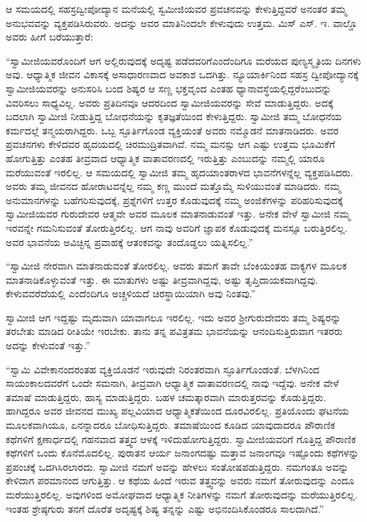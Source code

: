  ಆ ಸಮಯದಲ್ಲಿ ಸಹಸ್ರದ್ವೀಪೋದ್ಯಾನ ಮನೆಯಲ್ಲಿ ಸ್ವಮೀಜಿಯವರ ಪ್ರವಚನವನ್ನು ಕೇಳುತ್ತಿದ್ದವರೆ ಅನಂತರ ತಮ್ಮ ಅನುಭವವನ್ನು ವ್ಯಕ್ತಪಡಿಸಿರುವರು. ಅದನ್ನು ಅವರ ಮಾತಿನಿಂದಲೇ ಕೇಳುವುದು ಉತ್ತಮ. ಮಿಸ್ ಎಸ್. ಇ. ವಾಲ್ಡೊ ಅವರು ಹೀಗೆ ಬರೆಯುತ್ತಾರೆ: 

 “ಸ್ವಾಮೀಜಿಯವರೊಂದಿಗೆ ಆಗ ಅಲ್ಲಿರುವುದಕ್ಕೆ ಅದೃಷ್ಟ ಪಡೆದವರಿಗೆ\break ಎಂದೆಂದಿಗೂ ಮರೆಯದ ಪುಣ್ಯಸ್ಮೃತಿಯ ದಿನಗಳು ಅವು. ಆಧ್ಯಾತ್ಮಿಕ ಜೀವನ ವಿಕಾಸಕ್ಕೆ ಅಸಾಧಾರಣವಾದ ಅವಕಾಶ ಒದಗಿತ್ತು. ನ್ಯೂಯಾರ್ಕಿನಿಂದ ಸಹಸ್ರ ದ್ವೀಪೋದ್ಯಾನಕ್ಕೆ ಸ್ವಾಮೀಜಿಯವರನ್ನು ಅನುಸರಿಸಿ ಬಂದ ಶಿಷ್ಯರ ಆ ಸಣ್ಣ ಭಕ್ತವೃಂದ ಎಂತಹ ಧ್ಯಾನಾವಸ್ಥೆಯಲ್ಲಿದ್ದರೆಂಬುದನ್ನು ವಿವರಿಸಲು ಸಾಧ್ಯವಿಲ್ಲ. ಅವರು ಪ್ರತಿದಿನವೂ ಆದರದಿಂದ ಸ್ವಾಮೀಜಿಯವರನ್ನು ಸೇವೆ ಮಾಡುತ್ತಿದ್ದರು. ಅದಕ್ಕೆ ಬದಲಾಗಿ ಸ್ವಾಮೀಜಿ ನೀಡುತ್ತಿದ್ದ ಬೋಧನೆಯನ್ನು ಕೃತಜ್ಞತೆಯಿಂದ ಕೇಳುತ್ತಿದ್ದರು. ಸ್ವಾಮೀಜಿ ತಮ್ಮ ಬೋಧನೆಯ ಕರ್ಮದಲ್ಲೆ ತನ್ಮಯರಾಗಿದ್ದರು. ಒಬ್ಬ ಸ್ಫೂರ್ತಿಗೊಂಡ ವ್ಯಕ್ತಿಯಂತೆ ಅವರು ನಮ್ಮೊಡನೆ ಮಾತನಾಡಿದರು. ಅವರ ಪ್ರವಚನಗಳು ಕೇಳಿದವರ ಹೃದಯದಲ್ಲಿ ಚಿರಮುದ್ರಿತವಾಗಿವೆ. ನಮ್ಮ ಮನಸ್ಸು ಆಗ ಎಷ್ಟು ಉತ್ತಮ ಭೂಮಿಕೆಗೆ ಹೋಗುತ್ತಿತ್ತು ಎಂತಹ ತೀವ್ರವಾದ ಆಧ್ಯಾತ್ಮಿಕ ವಾತಾವರಣದಲ್ಲಿ ಇರುತ್ತಿತ್ತು ಎಂಬುದನ್ನು ನಮ್ಮಲ್ಲಿ ಯಾರೂ ಮರೆಯುವಂತೆ ಇರಲಿಲ್ಲ. ಆ ಸಮಯದಲ್ಲಿ ಸ್ವಾಮೀಜಿ ತಮ್ಮ ಹೃದಯಾಂತರಾಳದ ಭಾವನೆಗಳನ್ನೆಲ್ಲ ವ್ಯಕ್ತಪಡಿಸಿದರು. ಅವರು ತಮ್ಮ ಜೀವನದ ಹೋರಾಟವನ್ನೆಲ್ಲ ನಮ್ಮ ಕಣ್ಣ ಮುಂದೆ ಮತ್ತೊಮ್ಮೆ ಸುಳಿಯುವಂತೆ ಮಾಡಿದರು. ನಮ್ಮ ಅನುಮಾನಗಳನ್ನು ಬಹೆಗರಿಸುವುದಕ್ಕೆ, ಪ್ರಶ್ನೆಗಳಿಗೆ ಉತ್ತರ ಕೊಡುವುದಕ್ಕೆ ನಮ್ಮ ಅಂಜಿಕೆಗಳನ್ನು ಪರಿಹರಿಸುವುದಕ್ಕೆ ಸ್ವಾಮೀಜಿಯವರ ಗುರುದೇವರ ಆತ್ಮವೇ ಅವರ ಮೂಲಕ ಮಾತನಾಡುವಂತೆ ಇತ್ತು. ಅನೇಕ ವೇಳೆ ಸ್ವಾಮೀಜಿ ನಮ್ಮ ಇರವನ್ನೇ ಗಮನಿಸುವಂತೆ ತೋರುತ್ತಿರಲಿಲ್ಲ. ಆಗ ನಾವು ಅವರಿಗೆ ಜ್ಞಾಪಕ ಕೊಡುವುದಕ್ಕೆ ಮನಸ್ಸೂ ಬರುತ್ತಿರಲಿಲ್ಲ. ಅವರ ಭಾವನೆಯ ಅವಿಚ್ಛಿನ್ನ ಪ್ರವಾಹಕ್ಕೆ ಆತಂಕವನ್ನು ತಂದೊಡ್ಡಲು ಯತ್ನಿಸಲಿಲ್ಲ.” 

 “ಸ್ವಾಮೀಜಿ ನೇರವಾಗಿ ಮಾತನಾಡುವಂತೆ ತೋರಲಿಲ್ಲ. ಅವರು ತಮಗೆ ತಾವೇ ಬೆಂಕಿಯಂತಹ ವಾಕ್ಯಗಳ ಮೂಲಕ ಮಾತನಾಡಿಕೊಳ್ಳುವಂತೆ ಇತ್ತು. ಈ ಮಾತುಗಳು ಅಷ್ಟು ತೀವ್ರವಾಗಿದ್ದವು, ಅಷ್ಟು ತೃಪ್ತಿದಾಯಕವಾಗಿದ್ದವು. ಕೇಳುವವರೆದೆಯಲ್ಲಿ ಎಂದೆಂದಿಗೂ ಅಚ್ಚಳಿಯದೆ ಚಿರಸ್ಥಾಯಿಯಾಗಿ ಅವು ನಿಂತವು.” 

 ಸ್ವಾಮೀಜಿ ಆಗ ಇದ್ದಷ್ಟು ಮೃದುವಾಗಿ ಯಾವಾಗಲೂ ಇರಲಿಲ್ಲ. ಇದು ಅವರ ಶ‍್ರೀಗುರುದೇವರು ತಮ್ಮ ಶಿಷ್ಯರನ್ನು ತರಬೇತು ಮಾಡಿದ ರೀತಿಯೇ ಇರಬೇಕು. ತಾನು ತನ್ನ ಪವಿತ್ರತಮ ಭಾವನೆಯನ್ನು ಆನಂದಿಸುತ್ತಿರುವಾಗ ಇತರರು ಅದನ್ನು ಕೇಳುವಂತೆ ಇತ್ತು.” 

 “ಸ್ವಾಮಿ ವಿವೇಕಾನಂದರಂತಹ ವ್ಯಕ್ತಿಯೊಡನೆ ಇರುವುದೇ ನಿರಂತರವಾಗಿ ಸ್ಫೂರ್ತಿಗೊಂಡಂತೆ. ಬೆಳಗಿನಿಂದ ಸಾಯಂಕಾಲದವರೆಗೆ ಒಂದೇ ಸಮನಾಗಿ, ತೀವ್ರವಾಗಿ ಆಧ್ಯಾತ್ಮಿಕ ವಾತಾವರಣದಲ್ಲಿ ನಾವು ಇದ್ದೆವು. ಅನೇಕ ವೇಳೆ ತಮಾಷೆ ಮಾಡುತ್ತಿದ್ದರು, ಹಾಸ್ಯ ಮಾಡುತ್ತಿದ್ದರು. ಬಹಳ ಚಮತ್ಕಾರವಾಗಿ ಮಾರುತ್ತರವನ್ನು ಕೊಡುತ್ತಿದ್ದರು. ಹಾಗಿದ್ದರೂ ಅವರ ಜೀವನದ ಮುಖ್ಯ ಪಲ್ಲವಿಯಾದ ಆಧ್ಯಾತ್ಮಿಕತೆಯಿಂದ ದೂರವಿರಲಿಲ್ಲ. ಪ್ರತಿಯೊಂದು ಘಟನೆಯ ಮೂಲಕವಾಗಿಯೂ, ಏನನ್ನಾದರೂ ಬೋಧಿಸುತ್ತಿದ್ದರು. ತಮಾಷೆಯಿಂದ ಕೂಡಿದ ಯಾವುದಾದರೂ ಪೌರಾಣಿಕ ಕಥೆಗಳಿಗೆ ಕ್ಷಣಾರ್ಧದಲ್ಲಿ ಗಹನವಾದ ತತ್ತ್ವದ ಆಳಕ್ಕೆ ಇಳಿದುಹೋಗುತ್ತಿದ್ದರು. ಸ್ವಾಮೀಜಿಯವರಿಗೆ ಗೊತ್ತಿದ್ದ ಪೌರಾಣಿಕ ಕಥೆಗಳಿಗೆ ಒಂದು ಕೊನೆಮೊದಲಿಲ್ಲ. ಪುರಾತನ ಆರ್ಯ ಜನಾಂಗದಷ್ಟು ಮತ್ತಾವ ಜನಾಂಗವೂ ಇಷ್ಟೊಂದು ಕಥೆಗಳನ್ನು ಪ್ರಪಂಚಕ್ಕೆ ಒದಗಿಸಿರಲಾರದು. ಸ್ವಾಮೀಜಿ ನಮಗೆ ಅವನ್ನು ಹೇಳಲು ಸಂತೋಷಪಡುತ್ತಿದ್ದರು. ನಮಗಂತೂ ಅವನ್ನು ಕೇಳಿದಾಗ ಪರಮಾನಂದ ಆಗುತ್ತಿತ್ತು. ಆ ಕಥೆಯ ಹಿಂದೆ ಇರುವ ತತ್ತ್ವವನ್ನು ಅವರು ನಮಗೆ ತೋರುವುದನ್ನು ಎಂದೂ ಮರೆಯುತ್ತಿರಲಿಲ್ಲ. ಅವುಗಳಿಂದ ಅಮೋಘವಾದ ಆಧ್ಯಾತ್ಮಿಕ ನೀತಿಗಳನ್ನು ನಮಗೆ ತೋರುವುದನ್ನು ಮರೆಯುತ್ತಿರಲಿಲ್ಲ. ಇಂತಹ ಶ್ರೇಷ್ಠಗುರು ತನಗೆ ದೊರೆತ ಅದೃಷ್ಟಕ್ಕೆ ಶಿಷ್ಯ ತನ್ನನ್ನು ಎಷ್ಟು ಅಭಿನಂದಿಸಿಕೊಂಡರೂ ಸಾಲದಾಗಿದೆ.” 

